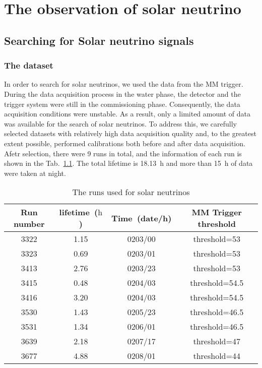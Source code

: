 \chapter{The observation of solar neutrino}
\label{chap:solar}

\section{Searching for Solar neutrino signals}
\label{sec:signal_screening}
\subsection{The dataset}
In order to search for solar neutrinos, we used the data from the MM trigger. During the data acquisition process in the water phase, the detector and the trigger system were still in the commissioning phase. Consequently, the data acquisition conditions were unstable. As a result, only a limited amount of data was available for the search of solar neutrinos. To address this, we carefully selected datasets with relatively high data acquisition quality and, to the greatest extent possible, performed calibrations both before and after data acquisition. Afetr selection, there were 9 runs in total, and the information of each run is shown in the Tab.~\ref{tab:summaryOfRuns_solar}. The total lifetime is \SI{18.13}{h} and more than \SI{15}{h} of data were taken at night.
\begin{table}[htbp]
	\centering
	\caption{The runs used for solar neutrinos}%
	\label{tab:summaryOfRuns_solar}
	\begin{tabular}{cccc}
		\toprule
		Run number & lifetime~($\text{h}$) & Time~(date/h) & MM Trigger threshold \\
		\midrule
		3322       & 1.15                  & 0203/00       & threshold=53         \\
		3323       & 0.69                  & 0203/01       & threshold=53         \\
		3413       & 2.76                  & 0203/23       & threshold=53         \\
		3415       & 0.48                  & 0204/03       & threshold=54.5       \\
		3416       & 3.20                  & 0204/03       & threshold=54.5       \\
		3530       & 1.43                  & 0205/23       & threshold=46.5       \\
		3531       & 1.34                  & 0206/01       & threshold=46.5       \\
		3639       & 2.18                  & 0207/17       & threshold=47         \\
		3677       & 4.88                  & 0208/01       & threshold=44         \\
		\bottomrule
	\end{tabular}
\end{table}

